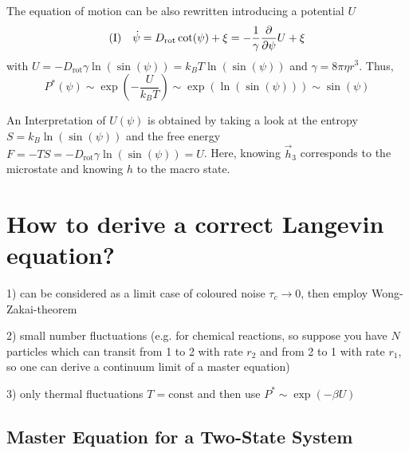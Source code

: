 \documentclass{/home/ben/Templates/notebook}
\begin{document}
	The equation of motion can be also rewritten introducing a potential $U$
	\begin{equation}
	\mathrm{(I)} \quad \dot{\psi} = D_{\mathrm{rot}} \cot(\psi) + \xi = - \frac{1}{\gamma} \pdv{\psi} U + \xi
	\end{equation}
	with $U = -  D_{\mathrm{rot}} \gamma \ln(\sin(\psi)) = k_B T \ln(\sin(\psi))$ and $\gamma = 8 \pi \eta r^3$. Thus,
	\begin{equation}
	P^*(\psi) \sim \exp(-\frac{U}{k_B T}) \sim \exp(\ln(\sin(\psi))) \sim \sin(\psi)
	\end{equation}
	
	An Interpretation of $U(\psi)$ is obtained by taking a look at the entropy $S = k_B \ln(\sin(\psi))$ and the free energy $F = -T S = - D_{\mathrm{rot}} \gamma \ln(\sin(\psi)) = U$. Here, knowing $\vec{h}_3$ corresponds to the microstate and knowing $h$ to the macro state.
	
	\section{How to derive a correct Langevin equation?}
	
	1) can be considered as a limit case of coloured noise $\tau_c \to 0$, then employ Wong-Zakai-theorem
	
	2) small number fluctuations (e.g. for chemical reactions, so suppose you have $N$ particles which can transit from 1 to 2 with rate $r_2$ and from 2 to 1 with rate $r_1$, so one can derive a continuum limit of a master equation)
	
	3) only thermal fluctuations $T = \mathrm{const}$ and then use $P^* \sim \exp(- \beta U)$
	
	\subsection*{Master Equation for a Two-State System}
	
\end{document}
